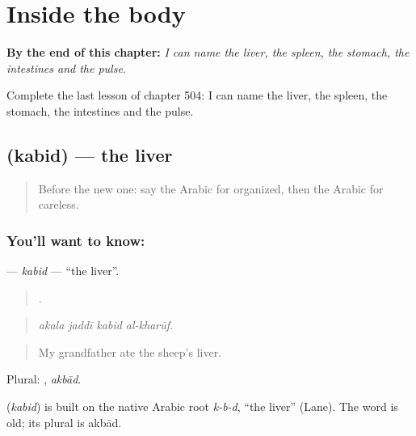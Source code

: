 
\chapter{Inside the body}
\label{ch:ar-inside-the-body}

\begin{chapteropening}
\textbf{By the end of this chapter:} \emph{I can name the liver, the spleen, the stomach, the intestines and the pulse.}

Complete the last lesson of chapter 504: I can name the liver, the spleen, the stomach, the intestines and the pulse.
\end{chapteropening}

\section[\texorpdfstring{\ar{كبد} (kabid)}{كبد (kabid)}]{ (kabid) — the liver}

\label{lesson:AR-C504-kabid}



\begin{quote}
Before the new one: say the Arabic for organized, then the Arabic for careless.
\end{quote}

\subsection*{You'll want to know: }
\textbf{} — \emph{kabid} — \textquotedblleft{}the liver\textquotedblright{}.

\begin{quote}
   .
\end{quote}

\begin{quote}
\emph{akala jaddī kabid al-kharūf.}
\end{quote}

\begin{quote}
My grandfather ate the sheep's liver.
\end{quote}

Plural: , \emph{akbād}.

\begin{cousinweb}
\textbf{} (\emph{kabid}) is built on the native Arabic root \emph{k-b-d}, \textquotedblleft{}the liver\textquotedblright{} (Lane). The word is old; its plural is akbād.
\end{cousinweb}

